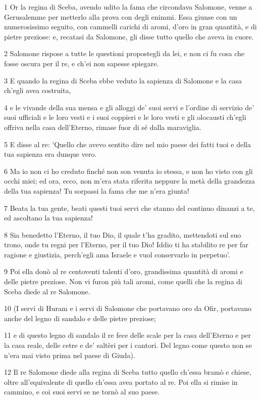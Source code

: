 \par 1 Or la regina di Sceba, avendo udito la fama che circondava Salomone, venne a Gerusalemme per metterlo alla prova con degli enimmi. Essa giunse con un numerosissimo seguito, con cammelli carichi di aromi, d'oro in gran quantità, e di pietre preziose: e, recatasi da Salomone, gli disse tutto quello che aveva in cuore.
\par 2 Salomone rispose a tutte le questioni propostegli da lei, e non ci fu cosa che fosse oscura per il re, e ch'ei non sapesse spiegare.
\par 3 E quando la regina di Sceba ebbe veduto la sapienza di Salomone e la casa ch'egli avea costruita,
\par 4 e le vivande della sua mensa e gli alloggi de' suoi servi e l'ordine di servizio de' suoi ufficiali e le loro vesti e i suoi coppieri e le loro vesti e gli olocausti ch'egli offriva nella casa dell'Eterno, rimase fuor di sé dalla maraviglia.
\par 5 E disse al re: 'Quello che avevo sentito dire nel mio paese dei fatti tuoi e della tua sapienza era dunque vero.
\par 6 Ma io non ci ho creduto finché non son venuta io stessa, e non ho visto con gli occhi miei; ed ora, ecco, non m'era stata riferita neppure la metà della grandezza della tua sapienza! Tu sorpassi la fama che me n'era giunta!
\par 7 Beata la tua gente, beati questi tuoi servi che stanno del continuo dinanzi a te, ed ascoltano la tua sapienza!
\par 8 Sia benedetto l'Eterno, il tuo Dio, il quale t'ha gradito, mettendoti sul suo trono, onde tu regni per l'Eterno, per il tuo Dio! Iddio ti ha stabilito re per far ragione e giustizia, perch'egli ama Israele e vuol conservarlo in perpetuo'.
\par 9 Poi ella donò al re centoventi talenti d'oro, grandissima quantità di aromi e delle pietre preziose. Non vi furon più tali aromi, come quelli che la regina di Sceba diede al re Salomone.
\par 10 (I servi di Huram e i servi di Salomone che portavano oro da Ofir, portavano anche del legno di sandalo e delle pietre preziose;
\par 11 e di questo legno di sandalo il re fece delle scale per la casa dell'Eterno e per la casa reale, delle cetre e de' saltèri per i cantori. Del legno come questo non se n'era mai visto prima nel paese di Giuda).
\par 12 Il re Salomone diede alla regina di Sceba tutto quello ch'essa bramò e chiese, oltre all'equivalente di quello ch'essa avea portato al re. Poi ella si rimise in cammino, e coi suoi servi se ne tornò al suo paese.
